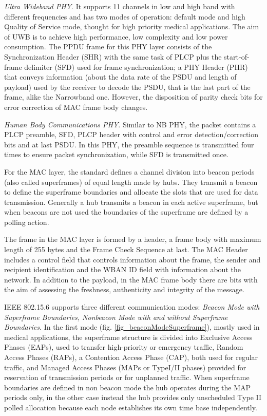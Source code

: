 \documentclass[conference]{IEEEtran}
\begin{document}
\textit{Ultra Wideband PHY}. It supports 11 channels in low and high band with different frequencies and has two modes of operation: default mode and high Quality of Service mode, thought for high priority medical applications. The aim of UWB is to achieve high performance, low complexity and low power consumption. The PPDU frame for this PHY layer consists of the Synchronization Header (SHR) with the same task of PLCP plus the start-of-frame delimiter (SFD) used for frame synchronization; a PHY Header (PHR) that conveys information (about the data rate of the PSDU and length of payload) used by the receiver to decode the PSDU, that is the last part of the frame, alike the Narrowband one. However, the disposition of parity check bits for error correction of MAC frame body changes.
\newline

\textit{Human Body Communications PHY}. Similar to NB PHY, the packet contains a PLCP preamble, SFD, PLCP header with control and error detection/correction bits and at last PSDU. In this PHY, the preamble sequence is transmitted four times to ensure packet synchronization, while SFD is transmitted once.
\newline

For the MAC layer, the standard defines a channel division into beacon periods (also called superframes) of equal length made by hubs. They transmit a beacon to define the superframe boundaries and allocate the slots that are used for data transmission. Generally a hub transmits a beacon in each active superframe, but when beacons are not used the boundaries of the superframe are defined by a polling action.

The frame in the MAC layer is formed by a header, a frame body with maximum length of 255 bytes and the Frame Check Sequence at last. The MAC Header includes a control field that controls information about the frame, the sender and recipient identification and the WBAN ID field with information about the network. In addition to the payload, in the MAC frame body there are bits with the aim of assessing the freshness, authenticity and integrity of the message.

IEEE 802.15.6 supports three different communication modes: \textit{Beacon Mode with Superframe Boundaries, Nonbeacon Mode with and without Superframe Boundaries}. In the first mode (fig. \ref{fig_beaconModeSuperframe}), mostly used in medical applications, the superframe structure is divided into Exclusive Access Phases (EAPs), used to transfer high-priority or emergency traffic, Random Access Phases (RAPs), a Contention Access Phase (CAP), both used for regular traffic, and Managed Access Phases (MAPs or TypeI/II phases) provided for reservation of transmission periods or for unplanned traffic. When superframe boundaries are defined in non beacon mode the hub operates during the MAP periods only, in the other case instead the hub provides only unscheduled Type II polled allocation because each node establishes its own time base independently.
\end{document}
